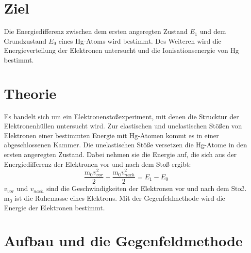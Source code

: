 \section{Ziel}
\label{Ziel}

Die Energiedifferenz zwischen dem ersten angeregten Zustand $E_1$ und dem Grundzustand $E_0$ eines Hg-Atoms wird bestimmt.
Des Weiteren wird die Energieverteilung der Elektronen untersucht und die Ionisationsenergie von Hg bestimmt.

\section{Theorie}
\label{sec:Theorie}

Es handelt sich um ein Elektronenstoßexperiment, mit denen die Strucktur der Elektronenhüllen untersucht wird.
Zur elastischen und unelastischen Stößen von Elektronen einer bestimmten Energie mit Hg-Atomen kommt es in einer abgeschlossenen Kammer.
Die unelastischen Stöße versetzen die Hg-Atome in den ersten angeregten Zustand.
Dabei nehmen sie die Energie auf, die sich aus der Energiedifferenz der Elektronen vor und nach dem Stoß ergibt:
\begin{equation}
    \frac{\text{m}_0 v_{vor}^2}{2} - \frac{\text{m}_0 v_{nach}^2}{2} = E_1 - E_0
    \label{eqn:gl1}
\end{equation}
$v_{vor} \text{ und } v_{nach}$ sind die Geschwindigkeiten der Elektronen vor und nach dem Stoß.
$\text{m}_0$ ist die Ruhemasse eines Elektrons.
Mit der Gegenfeldmethode wird die Energie der Elektronen bestimmt.

\section{Aufbau und die Gegenfeldmethode}
\label{Aufbau}

